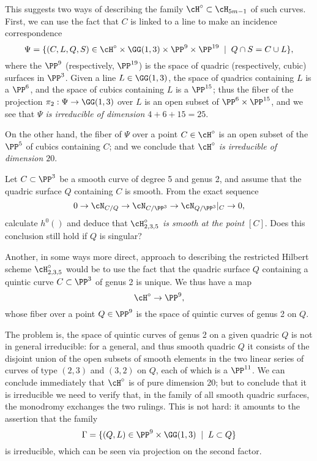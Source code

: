 This suggests two ways of describing the family $\cH^\circ \subset \cH_{5m-1}$ of such curves. First, we can use the fact that $C$ is linked to a line to make an incidence correspondence
$$
\Psi = \{ (C, L, Q, S) \in \cH^\circ \times \GG(1,3) \times \PP^9 \times \PP^{19} \; \mid \; Q \cap S = C \cup L \},
$$
where the $\PP^9$ (respectively, $\PP^{19}$) is the space of quadric (respectively, cubic) surfaces in $\PP^3$. Given a line $L \in \GG(1,3)$, the space of quadrics containing $L$ is a $\PP^6$, and the space of cubics containing $L$ is a $\PP^{15}$; thus the fiber of the projection $\pi_2 : \Psi \to \GG(1,3)$ over $L$ is an open subset of $\PP^6 \times \PP^{15}$, and we see that \emph{$\Psi$ is irreducible of dimension $4 + 6 + 15 = 25$}.

On the other hand, the fiber of $\Psi$ over a point $C \in \cH^\circ$ is an open subset of the $\PP^5$ of cubics containing $C$; and we conclude that \emph{$\cH^\circ$ is irreducible of dimension $20$}.

\begin{exercise}
Let $C \subset \PP^3$ be a smooth curve of degree 5 and genus 2, and assume that the quadric surface $Q$ containing $C$ is smooth. From the exact sequence
$$
0 \to \cN_{C/Q} \to  \cN_{C/\PP^3} \to  \cN_{Q/\PP^3}|_C \to 0,
$$
calculate $h^0()$ and deduce that \emph{$\cH^\circ_{2,3,5}$ is smooth at the point $[C]$}. Does  this conclusion still hold if $Q$ is singular?
\end{exercise}

Another, in some ways more direct, approach to describing the restricted Hilbert scheme $\cH^\circ_{2,3,5}$ would be to use the fact that the quadric surface $Q$ containing a quintic curve $C \subset \PP^3$ of genus 2 is unique. We thus have a map
$$
\cH^\circ \to \PP^9,
$$
whose fiber over a point $Q \in \PP^9$ is the space of quintic curves of genus 2 on $Q$. 

The problem is, the space of quintic curves of genus 2 on a given quadric $Q$ is not in general irreducible: for a general, and thus smooth quadric $Q$ it consists of the disjoint union of the open subsets of smooth elements in the two linear series of curves of type $(2,3)$ and $(3,2)$ on $Q$, each of which is a $\PP^{11}$. We can conclude immediately that $\cH^\circ$ is of pure dimension 20; but to conclude that it is irreducible we need to verify that, in the family of all smooth quadric surfaces, the monodromy exchanges the two rulings.  This is not hard: it amounts to the assertion that the family
$$
\Gamma = \{ (Q,L) \in \PP^9 \times \GG(1,3) \; \mid \; L \subset Q \}
$$
is irreducible, which can be seen via projection on the second factor.

